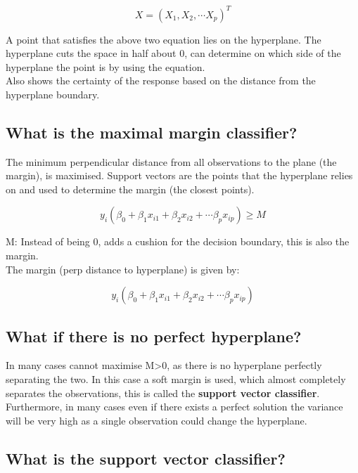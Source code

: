\documentclass[11pt]{scrartcl} %
\begin{document}
\begin{equation}
	X = (X_1,X_2,\cdots X_p)^T
\end{equation}

A point that satisfies the above two equation lies on the hyperplane. The hyperplane cuts the space
in half about 0, can determine on which side of the hyperplane the point is by using the equation.\\

Also shows the certainty of the response based on the distance from the hyperplane boundary.

\subsection{What is the maximal margin classifier?}

The minimum perpendicular distance from all observations to the plane (the margin), is maximised. Support vectors
are the points that the hyperplane relies on and used to determine the margin (the closest points).

\begin{equation}
	y_i(\beta_0+\beta_1x_{i1}+\beta_2x_{i2}+\cdots \beta_px_{ip}) \geq M
\end{equation}

M: Instead of being 0, adds a cushion for the decision boundary, this is also the margin.\\

The margin (perp distance to hyperplane) is given by:

\begin{equation}
	y_i(\beta_0+\beta_1x_{i1}+\beta_2x_{i2}+\cdots \beta_px_{ip})
\end{equation}

\subsection{What if there is no perfect hyperplane?}

In many cases cannot maximise M>0, as there is no hyperplane perfectly separating the two.
In this case a soft margin is used, which almost completely separates the observations, this
is called the \textbf{support vector classifier}.\\

Furthermore, in many cases even if there exists a perfect solution the variance will be very high
as a single observation could change the hyperplane.

\subsection{What is the support vector classifier?}
\end{document}
